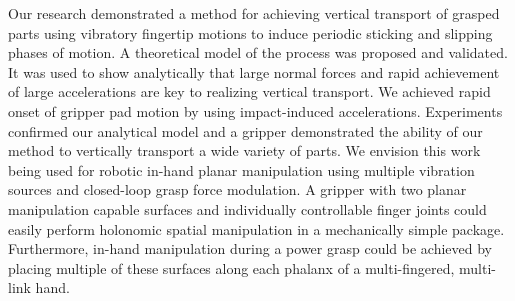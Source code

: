 
Our research demonstrated a method for achieving vertical transport of grasped parts using vibratory fingertip motions to induce periodic sticking and slipping phases of motion. 
%
A theoretical model of the process was proposed and validated. 
%
It was used to show analytically that large normal forces and rapid achievement of large accelerations are key to realizing vertical transport. 
%
We achieved rapid onset of gripper pad motion by using impact-induced accelerations. 
%
Experiments confirmed our analytical model and a gripper demonstrated the ability of our method to vertically transport a wide variety of parts. 
%
We envision this work being used for robotic in-hand planar manipulation using multiple vibration sources and closed-loop grasp force modulation.
%
A gripper with two planar manipulation capable surfaces and individually controllable finger joints could easily perform holonomic spatial manipulation in a mechanically simple package.
%
Furthermore, in-hand manipulation during a power grasp could be achieved by placing multiple of these surfaces along each phalanx of a multi-fingered, multi-link hand.
